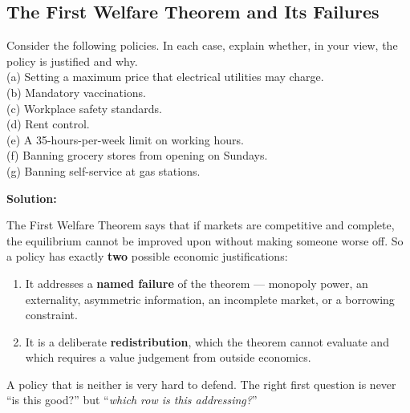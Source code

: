 \documentclass[12pt, letterpaper]{article}
\begin{document}
\subsection{The First Welfare Theorem and Its Failures}

\begin{tcolorbox}[oddbox,title={Problem 9.1 \quad The First Welfare Theorem}]
\begin{tcolorbox}[questionbox]
Consider the following policies. In each case, explain whether, in your view, the policy is
justified and why.\\[3pt]
(a) Setting a maximum price that electrical utilities may charge.\\
(b) Mandatory vaccinations.\\
(c) Workplace safety standards.\\
(d) Rent control.\\
(e) A 35-hours-per-week limit on working hours.\\
(f) Banning grocery stores from opening on Sundays.\\
(g) Banning self-service at gas stations.
\end{tcolorbox}

\textbf{Solution:}

\begin{tcolorbox}[theorybox,title={The method the chapter prescribes}]
The First Welfare Theorem says that if markets are competitive and complete, the equilibrium
cannot be improved upon without making someone worse off. So a policy has exactly
\textbf{two} possible economic justifications:
\begin{enumerate}[label=\arabic*.]
\item It addresses a \textbf{named failure} of the theorem --- monopoly power, an
externality, asymmetric information, an incomplete market, or a borrowing constraint.
\item It is a deliberate \textbf{redistribution}, which the theorem cannot evaluate and which
requires a value judgement from outside economics.
\end{enumerate}
A policy that is neither is very hard to defend. The right first question is never ``is this
good?'' but ``\emph{which row is this addressing?}''
\end{tcolorbox}


\end{tcolorbox}
\end{document}
